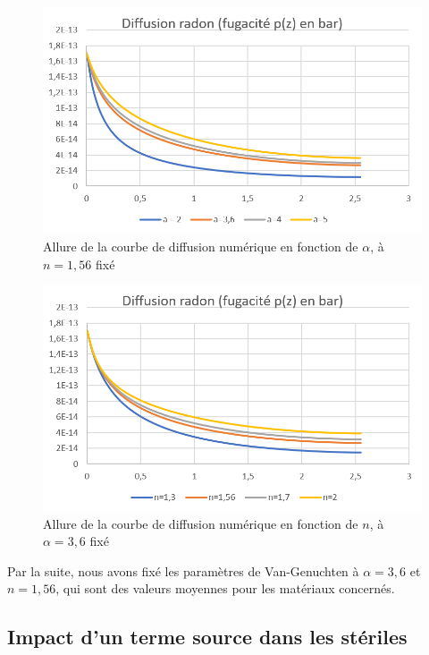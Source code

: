 \documentclass{article}
\begin{document}
\begin{figure}[H]
    \centering
    \includegraphics[height = 0.35 \textheight]{III_C_11.png}
    \caption{Allure de la courbe de diffusion numérique en fonction de $\alpha$, à $n=1,56$ fixé}
    \label{fig:sens_hytec_alpha}
\end{figure}
\begin{figure}[H]
    \centering
    \includegraphics[height = 0.35 \textheight]{III_C_12.png}
    \caption{Allure de la courbe de diffusion numérique en fonction de $n$, à $\alpha=3,6$ fixé}
    \label{fig:sens_hytec_n}
\end{figure}

Par la suite, nous avons fixé les paramètres de Van-Genuchten à $\alpha = 3,6$ et $n=1,56$, qui sont des valeurs moyennes pour les matériaux concernés.


\subsection{Impact d'un terme source dans les stériles}
\label{annexe:termesource}
\end{document}
